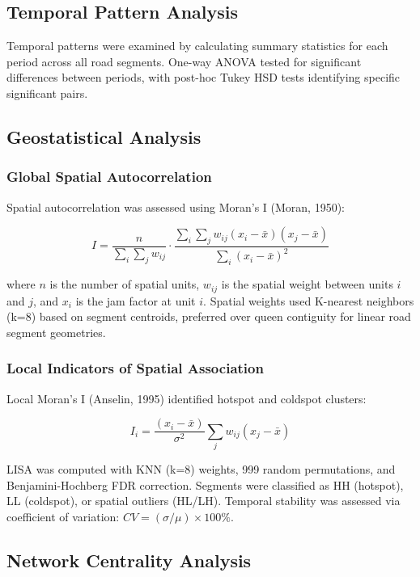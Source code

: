 \documentclass[12pt,a4paper]{article}
\begin{document}
\subsection{Temporal Pattern Analysis}

Temporal patterns were examined by calculating summary statistics for each period across all road segments. One-way ANOVA tested for significant differences between periods, with post-hoc Tukey HSD tests identifying specific significant pairs.

\subsection{Geostatistical Analysis}

\subsubsection{Global Spatial Autocorrelation}

Spatial autocorrelation was assessed using Moran's I (Moran, 1950):

\[I = \frac{n}{\sum_i \sum_j w_{ij}} \cdot \frac{\sum_i \sum_j w_{ij}(x_i - \bar{x})(x_j - \bar{x})}{\sum_i (x_i - \bar{x})^2}\]

where $n$ is the number of spatial units, $w_{ij}$ is the spatial weight between units $i$ and $j$, and $x_i$ is the jam factor at unit $i$. Spatial weights used K-nearest neighbors (k=8) based on segment centroids, preferred over queen contiguity for linear road segment geometries.

\subsubsection{Local Indicators of Spatial Association}

Local Moran's I (Anselin, 1995) identified hotspot and coldspot clusters:

\[I_i = \frac{(x_i - \bar{x})}{\sigma^2} \sum_j w_{ij}(x_j - \bar{x})\]

LISA was computed with KNN (k=8) weights, 999 random permutations, and Benjamini-Hochberg FDR correction. Segments were classified as HH (hotspot), LL (coldspot), or spatial outliers (HL/LH). Temporal stability was assessed via coefficient of variation: $CV = (\sigma/\mu) \times 100\%$.

\subsection{Network Centrality Analysis}
\end{document}

